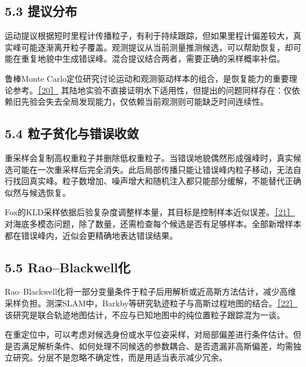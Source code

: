 \hypertarget{ux63d0ux8baeux5206ux5e03}{%
\subsection{5.3 提议分布}\label{ux63d0ux8baeux5206ux5e03}}

运动提议根据短时里程计传播粒子，有利于持续跟踪，但如果里程计偏差较大，真实峰可能逐渐离开粒子覆盖。观测提议从当前测量推测候选，可以帮助恢复，却可能在重复地貌中生成错误峰。混合提议结合两者，需要正确的采样概率补偿。

鲁棒Monte Carlo定位研究讨论运动和观测驱动样本的组合，是恢复能力的重要理论参考。\href{https://www.borg.cc.gatech.edu/projects/monte-carlo-localization.html}{［20］} 其陆地实验不直接证明水下适用性，但提出的问题同样存在：仅依赖旧先验会失去全局发现能力，仅依赖当前观测则可能缺乏时间连续性。

\hypertarget{ux7c92ux5b50ux8d2bux5316ux4e0eux9519ux8befux6536ux655b}{%
\subsection{5.4 粒子贫化与错误收敛}\label{ux7c92ux5b50ux8d2bux5316ux4e0eux9519ux8befux6536ux655b}}

重采样会复制高权重粒子并删除低权重粒子。当错误地貌偶然形成强峰时，真实候选可能在一次重采样后完全消失。此后局部传播只能让错误峰内粒子移动，无法自行找回真实峰。粒子数增加、噪声增大和随机注入都只能部分缓解，不能替代正确似然与候选恢复。

Fox的KLD采样依据后验复杂度调整样本量，其目标是控制样本近似误差。\href{https://papers.neurips.cc/paper_files/paper/2001/hash/c5b2cebf15b205503560c4e8e6d1ea78-Abstract.html}{［21］} 对海底多模态问题，除了数量，还需检查每个候选是否有足够样本。全部新增样本都在错误峰内，近似会更精确地表达错误结果。

\hypertarget{raoblackwellux5316}{%
\subsection{5.5 Rao--Blackwell化}\label{raoblackwellux5316}}

Rao--Blackwell化将一部分变量条件于粒子后用解析或近高斯方法估计，减少高维采样负担。测深SLAM中，Barkby等研究轨迹粒子与高斯过程地图的结合。\href{https://doi.org/10.1177/0278364912459666}{［22］} 该研究是联合轨迹地图估计，不应与已知地图中的纯位置粒子跟踪混为一谈。

在重定位中，可以考虑对候选身份或水平位姿采样，对局部偏差进行条件估计。但是否满足解析条件、如何处理不同候选的参数耦合、是否遗漏非高斯偏差，均需独立研究。分层不是忽略不确定性，而是用适当表示减少冗余。

